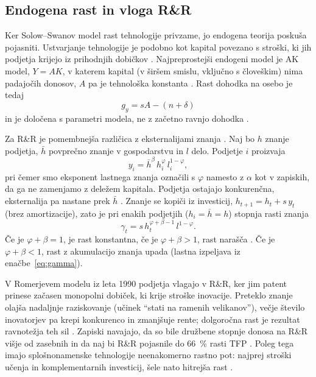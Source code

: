\documentclass[12pt,a4paper]{article}
\begin{document}
\subsection{Endogena rast in vloga R\&R}\label{sec:endogena}
Ker Solow--Swanov model rast tehnologije privzame, jo endogena teorija poskuša pojasniti. Ustvarjanje tehnologije je podobno kot kapital povezano s stroški, ki jih podjetja krijejo iz prihodnjih dobičkov \parencite[str.~18]{polanec_rast}. Najpreprostejši endogeni model je AK model, $Y=AK$, v katerem kapital (v širšem smislu, vključno s človeškim) nima padajočih donosov, $A$ pa je tehnološka konstanta \parencite[str.~19]{polanec_rast}. Rast dohodka na osebo je tedaj
\begin{equation}\label{eq:AK}
g_y=sA-(n+\delta)
\end{equation}
in je določena s parametri modela, ne z začetno ravnjo dohodka \parencite[str.~19--20]{polanec_rast}.

Za R\&R je pomembnejša različica z eksternalijami znanja \parencites[str.~25--27]{polanec_rast}{romer1986}. Naj bo $h$ znanje podjetja, $\bar h$ povprečno znanje v gospodarstvu in $l$ delo. Podjetje $i$ proizvaja
\begin{equation}\label{eq:romer}
y_i=\bar h^{\beta}\,h_i^{\varphi}\,l_i^{1-\varphi},
\end{equation}
pri čemer smo eksponent lastnega znanja označili s $\varphi$ namesto z $\alpha$ kot v zapiskih, da ga ne zamenjamo z deležem kapitala. Podjetja ostajajo konkurenčna, eksternalija pa nastane prek $\bar h$ \parencite[str.~26]{polanec_rast}. Znanje se kopiči iz investicij, $h_{t+1}=h_t+s\,y_t$ (brez amortizacije), zato je pri enakih podjetjih ($h_i=\bar h=h$) stopnja rasti znanja
\begin{equation}\label{eq:gamma}
\gamma_t=s\,h_t^{\varphi+\beta-1}\,l^{1-\varphi}.
\end{equation}
Če je $\varphi+\beta=1$, je rast konstantna, če je $\varphi+\beta>1$, rast narašča \parencite[str.~26--27]{polanec_rast}. Če je $\varphi+\beta<1$, rast z akumulacijo znanja upada (lastna izpeljava iz enačbe~\eqref{eq:gamma}).

V Romerjevem modelu iz leta 1990 podjetja vlagajo v R\&R, ker jim patent prinese začasen monopolni dobiček, ki krije stroške inovacije. Preteklo znanje olajša nadaljnje raziskovanje (učinek ``stati na ramenih velikanov''), večje število inovatorjev pa krepi konkurenco in zmanjšuje rente; dolgoročna rast je rezultat ravnotežja teh sil \parencites[str.~27--28]{polanec_rast}{romer1990}. Zapiski navajajo, da so bile družbene stopnje donosa na R\&R višje od zasebnih in da naj bi R\&R pojasnile do 66~\% rasti TFP \parencite[str.~27--28]{polanec_rast}. Poleg tega imajo splošnonamenske tehnologije neenakomerno rastno pot: najprej stroški učenja in komplementarnih investicij, šele nato hitrejša rast \parencites[str.~28]{polanec_rast}{bresnahan1995}.
\end{document}
